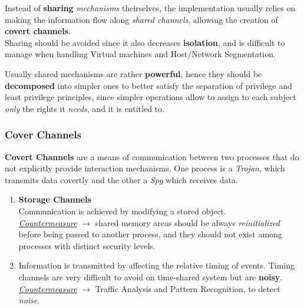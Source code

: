 Instead of \textbf{sharing} \textit{mechanisms} theirselves,
the implementation usually relies on making the information flow along \textit{shared channels}, 
allowing the creation of \textbf{covert channels}.\\
Sharing should be avoided since it also decreases \textbf{isolation},
and is difficult to manage when handling Virtual machines
and Host/Network Segmentation.

Usually shared mechanisms are rather \textbf{powerful}, hence they should be \textbf{decomposed} into
simpler ones to
better satisfy the separation of privilege and least
privilege principles,
since simpler operations allow to assign to each subject \textit{only} the rights it \textit{needs}, and it is entitled to.

\subsubsection{Cover Channels}

\textbf{Covert Channels} are a means of communication between two processes that do not explicitly provide interaction mechanisms.
One process is a \textit{Trojan}, which transmits data covertly
and the other a \textit{Spy} which receives data.

\begin{enumerate}
   \item \textbf{Storage Channels}\\
   Communication is achieved by modifying a stored object.\\
   \emph{\underline{Countermeasure}} $\longrightarrow$
   shared memory areas should be always \textit{reinitialized} before being passed to another
   process,
   and they should not exist among processes with distinct security levels.
   \item Information is transmitted by affecting the relative timing of events.
   Timing channels are very difficult to avoid on time-shared system but are \textbf{noisy}.
   \emph{\underline{Countermeasure}} $\longrightarrow$ Traffic Analysis and Pattern Recognition, to detect \textit{noise}.
\end{enumerate}


